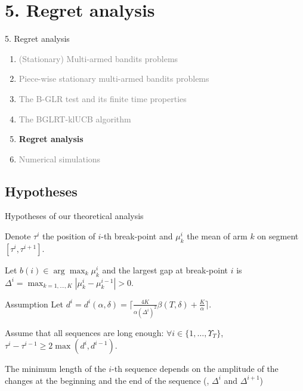 \documentclass[11pt,english,ignorenonframetext,]{beamer}
\begin{document}
\section{\hfill{}5. Regret analysis\hfill{}}

\begin{frame}{5. Regret analysis}

  \begin{enumerate}
    \item
    \textcolor{gray}{
      (Stationary) Multi-armed bandits problems
    }
    \vspace*{15pt}

    \item
    \textcolor{gray}{
      Piece-wise stationary multi-armed bandits problems
    }
    \vspace*{15pt}

    \item
    \textcolor{gray}{
      The B-GLR test and its finite time properties
    }
    \vspace*{15pt}

    \item
    \textcolor{gray}{
      The BGLRT-klUCB algorithm
    }
    \vspace*{15pt}

    \item
    \alert{\textbf{%
      Regret analysis
    }}
    \vspace*{15pt}

    \item
    \textcolor{gray}{
      Numerical simulations
    }
  \end{enumerate}

\end{frame}

\subsection{\hfill{}Hypotheses\hfill{}}

\begin{frame}{Hypotheses of our theoretical analysis}

  Denote $\tau^{i}$ the position of $i$-th break-point
  and $\mu_k^{i}$ the mean of arm $k$ on segment $[\tau^i, \tau^{i+1}]$.

  Let $b(i) \in \arg\max_k \mu_k^{i} $
  and the largest gap at break-point $i$ is
  $\Delta^{i} = \max_{k=1,\dots,K} |\mu_k^{i} - \mu_k^{i-1}| >0$.

  \begin{block}{Assumption}
    Let $d^{i} = d^{i}(\alpha,\delta) = \lceil \frac{4K}{\alpha(\Delta^{i})^2}\beta(T,\delta) + \frac{K}{\alpha} \rceil$.

    Assume that all sequences are long enough:
    $\forall i \in \{1,\dots,\Upsilon_T\}$, $\tau^{i} - \tau^{i-1} \geq 2\max( d^{i}, d^{i-1} )$.
  \end{block}

  The minimum length of the $i$-th sequence depends on the amplitude of the changes at the beginning and the end of the sequence (\ie, $\Delta^i$ and $\Delta^{i+1}$)

\end{frame}
\end{document}
